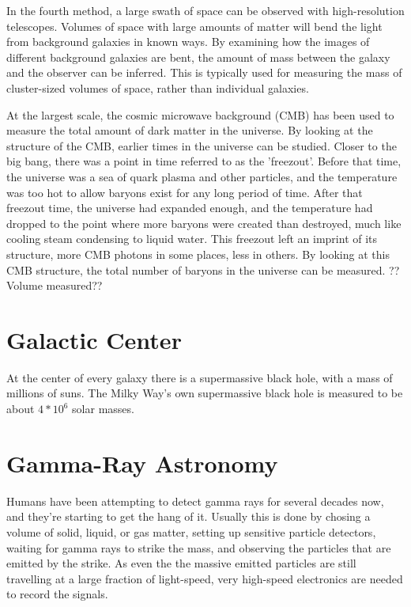 In the fourth method, a large swath of space can be observed with high-resolution telescopes.
Volumes of space with large amounts of matter will bend the light from background galaxies in known ways.
By examining how the images of different background galaxies are bent, the amount of mass between the galaxy and the observer can be inferred.
This is typically used for measuring the mass of cluster-sized volumes of space, rather than individual galaxies.

At the largest scale, the cosmic microwave background (CMB) has been used to measure the total amount of dark matter in the universe.
By looking at the structure of the CMB, earlier times in the universe can be studied.
Closer to the big bang, there was a point in time referred to as the 'freezout'.
Before that time, the universe was a sea of quark plasma and other particles, and the temperature was too hot to allow baryons exist for any long period of time.
After that freezout time, the universe had expanded enough, and the temperature had dropped to the point where more baryons were created than destroyed, much like cooling steam condensing to liquid water.
This freezout left an imprint of its structure, more CMB photons in some places, less in others.
By looking at this CMB structure, the total number of baryons in the universe can be measured.
??Volume measured??




\section{Galactic Center}

At the center of every galaxy there is a supermassive black hole, with a mass of millions of suns.
The Milky Way's own supermassive black hole is measured to be about $4*10^6$ solar masses.

\section{Gamma-Ray Astronomy}
Humans have been attempting to detect gamma rays for several decades now, and they're starting to get the hang of it.
Usually this is done by chosing a volume of solid, liquid, or gas matter, setting up sensitive particle detectors, waiting for gamma rays to strike the mass, and observing the particles that are emitted by the strike.
As even the the massive emitted particles are still travelling at a large fraction of light-speed, very high-speed electronics are needed to record the signals.

